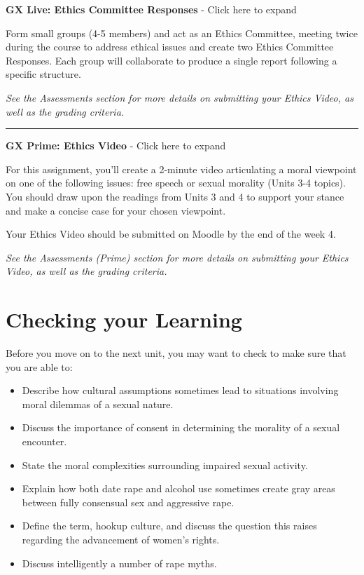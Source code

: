 \documentclass[
]{book}
\providecommand{\tightlist}{%
  \setlength{\itemsep}{0pt}\setlength{\parskip}{0pt}}
\begin{document}
\begin{assessment}
\textbf{GX Live: Ethics Committee Responses} - Click here to expand

Form small groups (4-5 members) and act as an Ethics Committee, meeting twice during the course to address ethical issues and create two Ethics Committee Responses. Each group will collaborate to produce a single report following a specific structure.

\emph{See the Assessments section for more details on submitting your Ethics Video, as well as the grading criteria.}

\begin{center}\rule{0.5\linewidth}{0.5pt}\end{center}

\textbf{GX Prime: Ethics Video} - Click here to expand

For this assignment, you'll create a 2-minute video articulating a moral viewpoint on one of the following issues: free speech or sexual morality (Units 3-4 topics). You should draw upon the readings from Units 3 and 4 to support your stance and make a concise case for your chosen viewpoint.

Your Ethics Video should be submitted on Moodle by the end of the week 4.

\emph{See the Assessments (Prime) section for more details on submitting your Ethics Video, as well as the grading criteria.}
\end{assessment}

\hypertarget{checking-your-learning-3}{%
\section*{Checking your Learning}\label{checking-your-learning-3}}

\begin{progress}
Before you move on to the next unit, you may want to check to make sure that you are able to:

\begin{itemize}
\tightlist
\item
  Describe how cultural assumptions sometimes lead to situations involving moral dilemmas of a sexual nature.
\item
  Discuss the importance of consent in determining the morality of a sexual encounter.
\item
  State the moral complexities surrounding impaired sexual activity.
\item
  Explain how both date rape and alcohol use sometimes create gray areas between fully consensual sex and aggressive rape.
\item
  Define the term, hookup culture, and discuss the question this raises regarding the advancement of women's rights.
\item
  Discuss intelligently a number of rape myths.
\end{itemize}
\end{progress}
\end{document}
